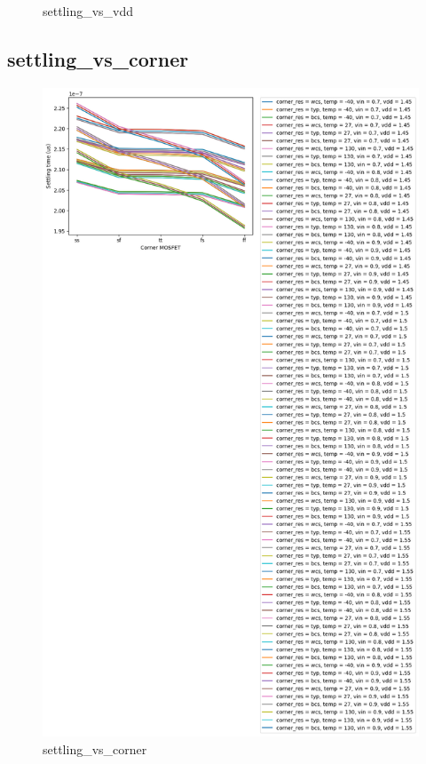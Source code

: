 \documentclass[
  a4paper,
  DIV=11,
  numbers=noendperiod]{scrartcl}
\begin{document}
\begin{tcolorbox}
\begin{figure}[H]
{}

\caption{settling\_vs\_vdd}

\end{figure}%

\subsection*{settling\_vs\_corner}\label{settling_vs_corner-1}

\begin{figure}[H]

{\centering \includegraphics{./cace/_docs/ota-improved/schematic/settling_vs_corner.png}

}

\caption{settling\_vs\_corner}

\end{figure}%

\end{tcolorbox}
\end{document}
